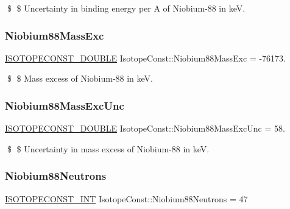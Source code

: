 \$ \$ Uncertainty in binding energy per A of Niobium-\/88 in keV. \mbox{\label{group___isotope_const-_niobium-_nb88_ga351d2d60249bb13c50d8f82891ef3196}} 
\subsubsection{\texorpdfstring{Niobium88\+Mass\+Exc}{Niobium88MassExc}}
{\footnotesize\ttfamily \mbox{\hyperlink{group___isotope_const-_macros_ga8f45a7272ce02c0b4c65c44636ed719a}{I\+S\+O\+T\+O\+P\+E\+C\+O\+N\+S\+T\+\_\+\+D\+O\+U\+B\+LE}} Isotope\+Const\+::\+Niobium88\+Mass\+Exc = -\/76173.}

\$ \$ Mass excess of Niobium-\/88 in keV. \mbox{\label{group___isotope_const-_niobium-_nb88_ga316b77fd1f5cfd77ff8c89e452b84f92}} 
\subsubsection{\texorpdfstring{Niobium88\+Mass\+Exc\+Unc}{Niobium88MassExcUnc}}
{\footnotesize\ttfamily \mbox{\hyperlink{group___isotope_const-_macros_ga8f45a7272ce02c0b4c65c44636ed719a}{I\+S\+O\+T\+O\+P\+E\+C\+O\+N\+S\+T\+\_\+\+D\+O\+U\+B\+LE}} Isotope\+Const\+::\+Niobium88\+Mass\+Exc\+Unc = 58.}

\$ \$ Uncertainty in mass excess of Niobium-\/88 in keV. \mbox{\label{group___isotope_const-_niobium-_nb88_ga44ac18dff12fbcb3144ae88362525b23}} 
\subsubsection{\texorpdfstring{Niobium88\+Neutrons}{Niobium88Neutrons}}
{\footnotesize\ttfamily \mbox{\hyperlink{group___isotope_const-_macros_ga5f18360b3e99483a35c32d789e62621c}{I\+S\+O\+T\+O\+P\+E\+C\+O\+N\+S\+T\+\_\+\+I\+NT}} Isotope\+Const\+::\+Niobium88\+Neutrons = 47}

